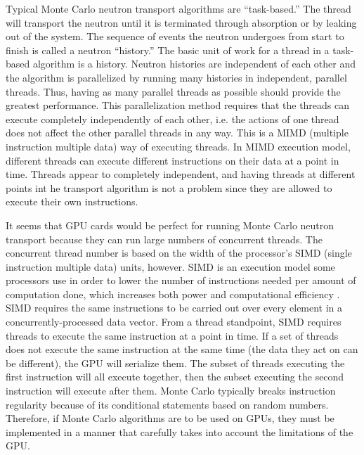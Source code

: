 Typical Monte Carlo neutron transport algorithms are ``task-based.''  The thread will transport the neutron until it is terminated through absorption or by leaking out of the system.  The sequence of events the neutron undergoes from start to finish is called a neutron ``history.''  The basic unit of work for a thread in a task-based algorithm is a history.  Neutron histories are independent of each other and the algorithm is parallelized by running many histories in independent, parallel threads.  Thus, having as many parallel threads as possible should provide the greatest performance.  This parallelization method requires that the threads can execute completely independently of each other, i.e. the actions of one thread does not affect the other parallel threads in any way.  This is a MIMD (multiple instruction multiple data) way of executing threads.  In MIMD execution model, different threads can execute different instructions on their data at a point in time.  Threads appear to completely independent, and having threads at different points int he transport algorithm is not a problem since they are allowed to execute their own instructions.

It seems that GPU cards would be perfect for running Monte Carlo neutron transport because they can run large numbers of concurrent threads.  The concurrent thread number is based on the width of the processor's SIMD (single instruction multiple data) units, however.  SIMD is an execution model some processors use in order to lower the number of instructions needed per amount of computation done, which increases both power and computational efficiency \cite{simd_power}.  SIMD requires the same instructions to be carried out over every element in a concurrently-processed data vector.  From a thread standpoint, SIMD requires threads to execute the same instruction at a point in time.  If a set of threads does not execute the same instruction at the same time (the data they act on can be different), the GPU will serialize them.  The subset of threads executing the first instruction will all execute together, then the subset executing the second instruction will execute after them.  Monte Carlo typically breaks instruction regularity because of its conditional statements based on random numbers.  Therefore, if Monte Carlo algorithms are to be used on GPUs, they must be implemented in a manner that carefully takes into account the limitations of the GPU.

